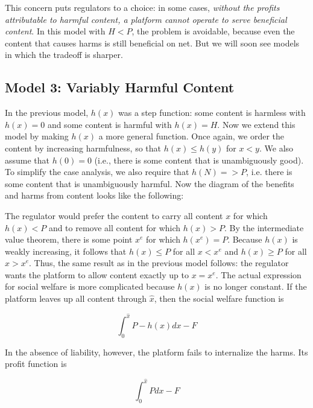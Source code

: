 
This concern puts regulators to a choice: in some cases, \emph{without the profits attributable to harmful content, a platform cannot operate to serve beneficial content}. In this model with $H < P$, the problem is avoidable, because even the content that causes harms is still beneficial on net. But we will soon see models in which the tradeoff is sharper.


\subsection{Model 3: Variably Harmful Content}

In the previous model, $h(x)$ was a step function: some content is harmless with $h(x) = 0$ and some content is harmful with $h(x) = H$. Now we extend this model by making $h(x)$ a more general function. Once again, we order the content by increasing harmfulness, so that $h(x) \le h(y)$ for $x < y$. We also assume that $h(0) =0$ (i.e., there is some content that is unambiguously good). To simplify the case analysis, we also require that $h(N) => P$, i.e. there is some content that is unambiguously harmful. Now the diagram of the benefits and harms from content looks like the following:


The regulator would prefer the content to carry all content $x$ for which $h(x) <P$ and to remove all content for which $h(x) > P$. By the intermediate value theorem, there is some point $x^e$ for which $h(x^e) = P$. Because $h(x)$ is weakly increasing, it follows that $h(x) \le P$ for all $x< x^e$ and $h(x) \ge P$ for all $x > x^e$. Thus, the same result as in the previous model follows: the regulator wants the platform to allow content exactly up to $x = x^e$. The actual expression for social welfare is more complicated because $h(x)$ is no longer constant. If the platform leaves up all content through $\hat{x}$, then the social welfare function is

\begin{equation}
\int_{0}^{\hat{x}} P - h(x) dx - F
\end{equation}

In the absence of liability, however, the platform fails to internalize the harms. Its profit function is 

\begin{equation}
\int_{0}^{\hat{x}} P dx - F
\end{equation}

